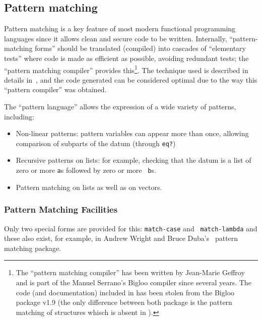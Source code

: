 \subsection{Pattern matching}

Pattern matching is a key feature of most
modern functional programming languages since it allows clean and
secure code to be written. Internally, ``pattern-matching forms''
should be translated (compiled) into cascades of ``elementary tests''
where code is made as efficient as possible, avoiding redundant tests;
the {\stk} ``pattern matching compiler'' provides this\footnote{The
  ``pattern matching compiler'' has been written by Jean-Marie Geffroy
  and is part of the Manuel Serrano's Bigloo compiler\cite{Serrano-97}
  since several years. The code (and documentation) included in {\stk}
  has been stolen from the Bigloo package v1.9 (the only difference
  between both package is the pattern matching of structures whisch is
  absent in {\stk}).}.  The technique used is described in details
in~\cite{Queinnec-Geffroy92}, and the code generated can be considered
optimal due to the way this ``pattern compiler'' was obtained.

The ``pattern language'' allows the expression of a wide variety of patterns,
including:

\begin{itemize}

\item Non-linear patterns: pattern variables can appear more than
once, allowing comparison of subparts of the datum (through {\tt eq?})

\item Recursive patterns on lists: for example, checking that the
datum is a list of zero or more {\tt a}s followed by zero or more {\tt
b}s.

\item Pattern matching on lists as well as on vectors.

\end{itemize}


\subsubsection*{Pattern Matching Facilities}

Only two special forms are provided for this: {\tt match-case} and {\tt
match-lambda} and these also exist, for example, in Andrew Wright and
Bruce Duba's~\cite{Wright-Duba-93} pattern matching package.

